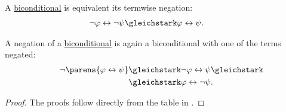 \begin{proposition}
\begin{thmenum}
     A \hyperref[def:propositional_language/connectives/biconditional]{biconditional} is equivalent its termwise negation:
    \begin{equation}\label{eq:thm:boolean_equivalences/biconditional_member_negation}
      \begin{aligned}
        \mathllap{\neg \varphi \leftrightarrow \neg \psi} &\gleichstark \mathrlap{\varphi \leftrightarrow \psi.}
      \end{aligned}
    \end{equation}

     A negation of a \hyperref[def:propositional_language/connectives/biconditional]{biconditional} is again a biconditional with one of the terms negated:
    \begin{equation}\label{eq:thm:boolean_equivalences/biconditional_negation}
      \begin{aligned}
        \mathllap{\neg \parens{\varphi \leftrightarrow \psi}}
        &\gleichstark
        \mathrlap{\neg \varphi \leftrightarrow \psi \gleichstark}
        \\ &\gleichstark
        \mathrlap{\varphi \leftrightarrow \neg \psi.} \nonumber
      \end{aligned}
    \end{equation}
  \end{thmenum}
\end{proposition}
\begin{proof}
  The proofs follow directly from the table in .
\end{proof}

